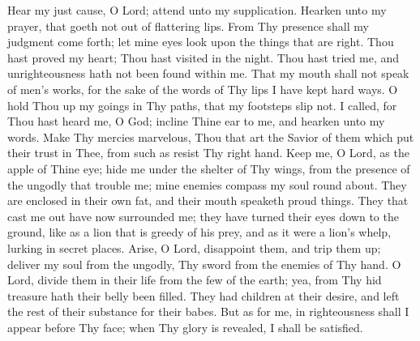 Hear my just cause, O Lord; attend unto my supplication. Hearken unto my prayer, that goeth not out of flattering lips. From Thy presence shall my judgment come forth; let mine eyes look upon the things that are right. Thou hast proved my heart; Thou hast visited in the night. Thou hast tried me, and unrighteousness hath not been found within me. That my mouth shall not speak of men’s works, for the sake of the words of Thy lips I have kept hard ways. O hold Thou up my goings in Thy paths, that my footsteps slip not. I called, for Thou hast heard me, O God; incline Thine ear to me, and hearken unto my words. Make Thy mercies marvelous, Thou that art the Savior of them which put their trust in Thee, from such as resist Thy right hand. Keep me, O Lord, as the apple of Thine eye; hide me under the shelter of Thy wings, from the presence of the ungodly that trouble me; mine enemies compass my soul round about. They are enclosed in their own fat, and their mouth speaketh proud things. They that cast me out have now surrounded me; they have turned their eyes down to the ground, like as a lion that is greedy of his prey, and as it were a lion’s whelp, lurking in secret places. Arise, O Lord, disappoint them, and trip them up; deliver my soul from the ungodly, Thy sword from the enemies of Thy hand. O Lord, divide them in their life from the few of the earth; yea, from Thy hid treasure hath their belly been filled. They had children at their desire, and left the rest of their substance for their babes. But as for me, in righteousness shall I appear before Thy face; when Thy glory is revealed, I shall be satisfied.
